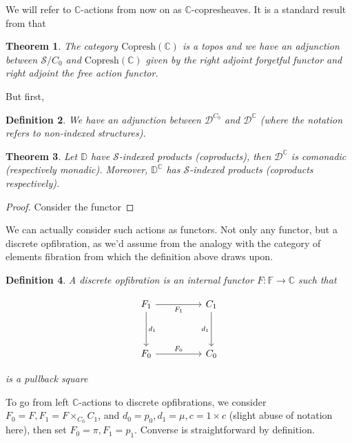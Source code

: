 \documentclass[10pt, oneside]{article}
\newtheorem{theorem}{Theorem}[section]
\newtheorem{definition}[theorem]{Definition}
\begin{document}
We will refer to $\mathbb{C}$-actions from now on as $\mathbb{C}$-copresheaves. It is a standard result from \cite{MacLane1994} that

\begin{theorem}
    The category $\mathrm{Copresh}{(\mathbb{C})}$ is a topos and we have an adjunction between $\mathcal{S}/C_0$ and $\mathrm{Copresh}{(\mathbb{C})}$ given by the right adjoint forgetful functor and right adjoint the free action functor.
\end{theorem}

But first,

\begin{definition}
    We have an adjunction between $\mathcal{D}^{C_0}$ and $\mathcal{D}^\mathbb{C}$ (where the notation refers to non-indexed structures).
\end{definition}

\begin{theorem}
    Let $\mathbb{D}$ have $\mathcal{S}$-indexed products (coproducts), then $\mathcal{D}^\mathbb{C}$ is comonadic (respectively monadic). Moreover, $\mathbb{D}^\mathbb{C}$ has $\mathcal{S}$-indexed products (coproducts respectively).
\end{theorem}
\begin{proof}
    Consider the functor
    
\end{proof}

We can actually consider such actions as functors. Not only any functor, but a discrete opfibration, as we'd assume from the analogy with the category of elements fibration from which the definition above draws upon.

\begin{definition}
    A discrete opfibration is an internal functor $F: \mathbb{F} \to \mathbb{C}$ such that

    \[\begin{tikzcd}[ampersand replacement=\&]
	{F_1} \&\& {C_1} \\
	\\
	{F_0} \&\& {C_0}
	\arrow["{d_1}", from=1-1, to=3-1]
	\arrow["{F_0}", from=3-1, to=3-3]
	\arrow["{F_1}"', from=1-1, to=1-3]
	\arrow["{d_1}"', from=1-3, to=3-3]
\end{tikzcd}\]

    \noindent is a pullback square
\end{definition}

To go from left $\mathbb{C}$-actions to discrete opfibrations, we consider $F_0 = F, F_1 = F \times_{C_0} C_1$, and  $d_0 = p_0, d_1 = \mu, c = 1 \times c$ (slight abuse of notation here), then set $F_0 = \pi, F_1 = p_1$. Converse is straightforward by definition.
\end{document}
